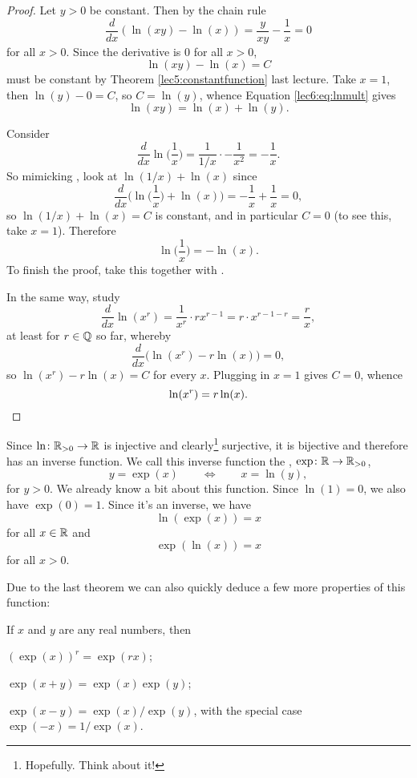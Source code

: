 \begin{proof}
	 Let $y > 0$ be constant. Then by the chain rule
	\[
		\frac{d}{d x} (\ln(x y) - \ln(x)) = \frac{y}{x y} - \frac{1}{x} = 0
	\]
	for all $x > 0$. Since the derivative is $0$ for all $x > 0$,
	\begin{equation}\label{lec6:eq:lnmult}
		\ln(x y) - \ln(x) = C
	\end{equation}
	must be constant by Theorem \ref{lec5:constantfunction} last lecture. Take $x = 1$, then $\ln(y) - 0 = C$, so $C = \ln(y)$, whence Equation \eqref{lec6:eq:lnmult} gives
	\[
		\ln(x y) = \ln(x) + \ln(y).
	\]

	 Consider
	\[
		\frac{d}{d x} \ln \Big ( \frac{1}{x} \Big ) = \frac{1}{1 / x} \cdot - \frac{1}{x^2} = - \frac{1}{x}.
	\]
	So mimicking , look at $\ln(1 / x) + \ln(x)$ since
	\[
		\frac{d}{d x} \Big ( \ln \big ( \frac{1}{x} \big ) + \ln(x) \Big ) = - \frac{1}{x} + \frac{1}{x} = 0,
	\]
	so $\ln(1 / x) + \ln(x) = C$ is constant, and in particular $C = 0$ (to see this, take $x = 1$). Therefore
	\[
		\ln \Big ( \frac{1}{x} \Big ) = - \ln(x).
	\]
	To finish the proof, take this together with .

	 In the same way, study
	\[
		\frac{d}{d x} \ln(x^r) = \frac{1}{x^r} \cdot r x^{r - 1} = r \cdot x^{r - 1 - r} = \frac{r}{x},
	\]
	at least for $r \in \mathbb{Q}$ so far, whereby
	\[
		\frac{d}{d x} \big ( \ln(x^r) - r \ln(x) \big ) = 0,
	\]
	so $\ln(x^r) - r \ln(x) = C$ for every $x$. Plugging in $x = 1$ gives $C = 0$, whence
	\[
		\ln(x^r) = r \ln(x). \qedhere
	\]
\end{proof}


Since $\ln \colon \mathbb{R}_{> 0} \to \mathbb{R}$ is injective and clearly\footnote{Hopefully. Think about it!} surjective, it is bijective and therefore has an inverse function. We call this inverse function the , $\exp \colon \mathbb{R} \to \mathbb{R}_{> 0}$,
\[
	y = \exp(x) \qquad \Longleftrightarrow \qquad x = \ln(y),
\]
for $y > 0$. We already know a bit about this function. Since $\ln(1) = 0$, we also have $\exp(0) = 1$. Since it's an inverse, we have
\[
	\ln(\exp(x)) = x
\]
for all $x \in \mathbb{R}$ and
\[
	\exp(\ln(x)) = x
\]
for all $x > 0$.

Due to the last theorem we can also quickly deduce a few more properties of this function:

\begin{theorem}
	If $x$ and $y$ are any real numbers, then
	\begin{romanlist}
		\item $(\exp(x))^r = \exp(r x)$;
		\item $\exp(x + y) = \exp(x) \exp(y)$;
		\item $\exp(x - y) = \exp(x) / \exp(y)$, with the special case $\exp(-x) = 1 / \exp(x)$.
	\end{romanlist}
\end{theorem}

